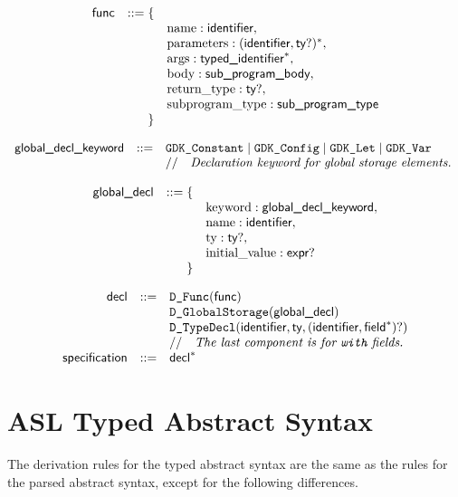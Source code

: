 \documentclass{book}
\begin{document}
\[
\begin{array}{rrl}
\textsf{func} &::= \{& \\
 & & \text{name} : \textsf{identifier}, \\
 & & \text{parameters} : (\textsf{identifier}, \textsf{ty}?)^*,\\
 & & \text{args} : \textsf{typed\_identifier}^*,\\
 & & \text{body} : \textsf{sub\_program\_body},\\
 & & \text{return\_type} : \textsf{ty}?,\\
 & & \text{subprogram\_type} : \textsf{sub\_program\_type}\\
 & \} &
\end{array}
\]

\[
\begin{array}{rcl}
\textsf{global\_decl\_keyword} &::=& \texttt{GDK\_Constant} \;|\; \texttt{GDK\_Config} \;|\; \texttt{GDK\_Let} \;|\; \texttt{GDK\_Var}\\
  & & //\quad\textit{Declaration keyword for global storage elements.}\ \\
\end{array}
\]

\[
\begin{array}{rrl}
\textsf{global\_decl} &::= \{& \\
 & & \text{keyword} : \textsf{global\_decl\_keyword}, \\
 & & \text{name} : \textsf{identifier},\\
 & & \text{ty} : \textsf{ty}?,\\
 & & \text{initial\_value} : \textsf{expr}?\\
 & \} &
\end{array}
\]

\[
\begin{array}{rcl}
\textsf{decl} &::=& \texttt{D\_Func}(\textsf{func})\\
  & & \texttt{D\_GlobalStorage}(\textsf{global\_decl})\\
  & & \texttt{D\_TypeDecl}(\textsf{identifier}, \textsf{ty}, (\textsf{identifier}, \textsf{field}^*)?)\\
  & & //\quad\textit{The last component is for \texttt{with} fields.}\ \\
\textsf{specification} &::=& \textsf{decl}^*\\
\end{array}
\]

\section{ASL Typed Abstract Syntax}

The derivation rules for the typed abstract syntax are the same as the rules for the parsed abstract syntax,
except for the following differences.
\end{document}
